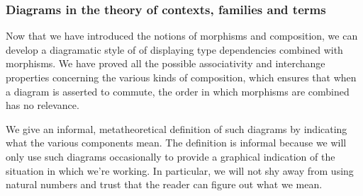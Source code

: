 \subsubsection{Diagrams in the theory of contexts, families and terms}
\label{pullback}
Now that we have introduced the notions of morphisms and composition,
we can develop a diagramatic style of of displaying type dependencies
combined with morphisms. We have proved all the possible associativity and
interchange properties concerning the various kinds of composition, which
ensures that when a diagram is asserted to commute, the order in which
morphisms are combined has no relevance.

We give an informal, metatheoretical definition of
such diagrams by indicating what the various components mean. The definition
is informal because we will only use such diagrams occasionally to provide a
graphical indication of the situation in which we're working. In particular,
we will not shy away from using natural numbers and trust that the reader can
figure out what we mean.

